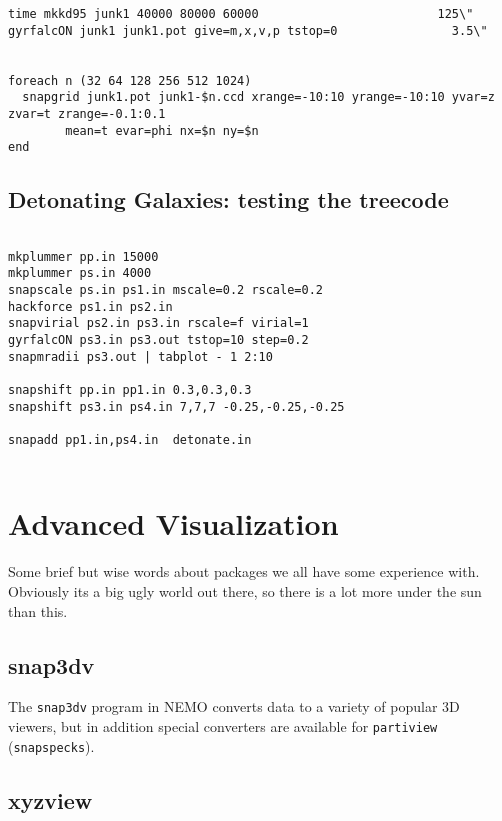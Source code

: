 \footnotesize\begin{verbatim}
time mkkd95 junk1 40000 80000 60000                         125\"
gyrfalcON junk1 junk1.pot give=m,x,v,p tstop=0                3.5\"


foreach n (32 64 128 256 512 1024)
  snapgrid junk1.pot junk1-$n.ccd xrange=-10:10 yrange=-10:10 yvar=z zvar=t zrange=-0.1:0.1 
        mean=t evar=phi nx=$n ny=$n
end

\end{verbatim}\normalsize  %

\section{Detonating Galaxies: testing the treecode}

\footnotesize\begin{verbatim}

mkplummer pp.in 15000
mkplummer ps.in 4000
snapscale ps.in ps1.in mscale=0.2 rscale=0.2
hackforce ps1.in ps2.in
snapvirial ps2.in ps3.in rscale=f virial=1
gyrfalcON ps3.in ps3.out tstop=10 step=0.2
snapmradii ps3.out | tabplot - 1 2:10

snapshift pp.in pp1.in 0.3,0.3,0.3
snapshift ps3.in ps4.in 7,7,7 -0.25,-0.25,-0.25

snapadd pp1.in,ps4.in  detonate.in


\end{verbatim}\normalsize  



\chapter                {Advanced Visualization}

Some brief but wise words about packages we all have some experience with.
Obviously its a big ugly world out there, so there is a lot more under the
sun than this.

\section{snap3dv}

The {\tt snap3dv} program in NEMO converts data to a variety of popular
3D viewers, but in addition special converters are available 
for {\tt partiview} ({\tt snapspecks}).

\section{xyzview}

